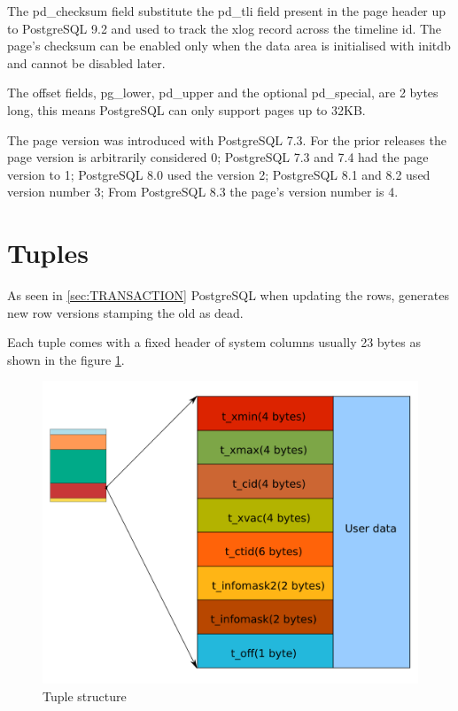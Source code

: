 The pd\_checksum field substitute the pd\_tli field 
present in the page header up to PostgreSQL 9.2 and used to track the 
xlog record across the timeline id. 
The page's checksum can be enabled only when the data area is initialised with 
initdb and cannot be disabled later.\newline

The offset fields, pg\_lower, pd\_upper and the optional pd\_special, are 2 
bytes long, this means PostgreSQL can only support pages up to 32KB.\newline

The page version was introduced with PostgreSQL 7.3. 
For the prior releases the page version is arbitrarily considered 0; PostgreSQL 
7.3 and 7.4 had the page version to 1; PostgreSQL 8.0 used the version 2; 
PostgreSQL 8.1 and 8.2 used version number 3; From PostgreSQL 8.3 the page's 
version number is 4.

\section{Tuples}
\label{sec:TUPLES}
As seen in \ref{sec:TRANSACTION} PostgreSQL when updating the rows, generates 
new row versions stamping the old as dead. \newline

Each tuple comes with a fixed header of system columns usually 23 bytes as 
shown in the figure \ref{fig:TUPLES01}.\newline





\begin{figure}[H]
\begin{center}

\includegraphics[scale=0.55]{images/tuples_01.png}

\caption{Tuple structure}
\label{fig:TUPLES01} 
\end{center}

\end{figure}

